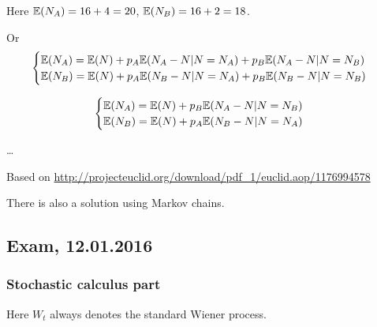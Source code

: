 \documentclass[12pt, a4paper]{article}
\begin{document}
\begin{enumerate}
Here $\mathbb{E}(N_A) = 16 + 4 =20$, $\mathbb{E}(N_B) = 16 + 2 =18$.

Or
\[
\begin{cases}
\mathbb{E}(N_A) = \mathbb{E}(N) + p_A\mathbb{E}(N_A - N | N=N_A) + p_B \mathbb{E}(N_A - N | N=N_B) \\
\mathbb{E}(N_B) = \mathbb{E}(N) + p_A\mathbb{E}(N_B - N | N=N_A) + p_B \mathbb{E}(N_B - N | N=N_B) \\
\end{cases}
\]

\[
\begin{cases}
\mathbb{E}(N_A) = \mathbb{E}(N) + p_B \mathbb{E}(N_A - N | N=N_B) \\
\mathbb{E}(N_B) = \mathbb{E}(N) + p_A \mathbb{E}(N_B - N | N=N_A)  \\
\end{cases}
\]

\ldots

Based on \url{http://projecteuclid.org/download/pdf_1/euclid.aop/1176994578}

There is also a solution using Markov chains.

\end{enumerate}



\subsection{Exam, 12.01.2016}

\subsubsection*{Stochastic calculus part}

Here $W_t$ always denotes the standard Wiener process.

\vspace{10pt}
\end{document}
